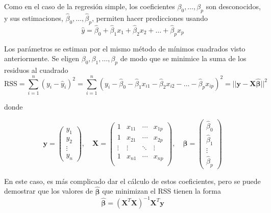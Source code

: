Como en el caso de la regresión simple, los coeficientes $\beta_0, \dots, \beta_p$ son desconocidos, y sus estimaciones, $\hat{\beta}_0, \dots, \hat{\beta}_p$, permiten hacer predicciones usando 
\begin{equation}
\hat{y} = \hat{\beta}_0 + \hat{\beta}_1 x_1 + \hat{\beta}_2 x_2 + \dots + \hat{\beta}_p x_p
\label{eq:3.21}
\end{equation}

Los parámetros se estiman por el mismo método de mínimos cuadrados visto anteriormente. Se eligen $\beta_0, \beta_1, \dots, \beta_p$ de modo que se minimice la suma de los residuos al cuadrado
\begin{equation}
\text{RSS} = \sum_{i=1}^n (y_i - \hat{y}_i)^2 = \sum_{i=1}^n (y_i - \hat{\beta}_0 - \hat{\beta}_1 x_{i1} - \hat{\beta}_2 x_{i2} - \dots - \hat{\beta}_p x_{ip})^2 = ||\mathbf{y} - \mathbf{X}\boldsymbol{\hat{\beta}}||^2
\end{equation}

\noindent donde 

\begin{equation}
\mathbf{y} = 
\begin{pmatrix}
y_1 \\
y_2 \\
\vdots \\
y_n
\end{pmatrix}, \quad \mathbf{X} = 
\begin{pmatrix}
1 & x_{11} & \cdots & x_{1p} \\
1 & x_{21} & \cdots & x_{2p} \\
\vdots & \vdots & \ddots & \vdots \\
1 & x_{n1} & \cdots & x_{np} \\
\end{pmatrix}, \quad \boldsymbol{\hat{\beta}} = 
\begin{pmatrix}
\hat{\beta}_0 \\
\hat{\beta}_1 \\
\vdots \\
\hat{\beta}_p
\end{pmatrix}
\end{equation}

En este caso, es más complicado dar el cálculo de estos coeficientes, pero se puede demostrar que los valores de $\boldsymbol{\hat{\beta}}$ que minimizan el RSS tienen la forma 
\begin{equation}
\boldsymbol{\hat{\beta}} = (\mathbf{X}^T\mathbf{X})^{-1} \mathbf{X}^T \mathbf{y}
\end{equation}

